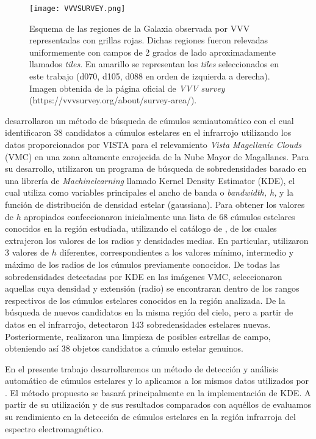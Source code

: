 \documentclass[baaa]{baaa}
\begin{document}
 
 \begin{figure*}[!t]
\centering

\texttt{[image: VVVSURVEY.png]}
\caption{Esquema de las regiones de la Galaxia observada por VVV representadas con grillas rojas. Dichas regiones fueron relevadas uniformemente con campos de 2 grados de lado aproximadamente llamados \textit{tiles}. En amarillo se representan los \textit{tiles} seleccionados en este trabajo (d070, d105, d088 en orden de izquierda a derecha). Imagen obtenida de la página oficial de \textit{VVV survey} (https://vvvsurvey.org/about/survey-area/).}
\label{Figura}

\end{figure*}
 \par
\cite{piatti2016vmc} desarrollaron un método de búsqueda de cúmulos semiautomático con el cual identificaron 38 candidatos a cúmulos estelares en el infrarrojo utilizando los datos proporcionados por VISTA para el relevamiento \textit{Vista Magellanic Clouds} (VMC) en una zona altamente enrojecida de la Nube Mayor de Magallanes. Para su desarrollo, utilizaron un programa de búsqueda de sobredensidades basado en una librería de \textit{Machinelearning} llamado {\sc Kernel Density Estimator (KDE), el} cual utiliza como variables principales el ancho de banda o \textit{bandwidth, h,} y la función de distribución de densidad estelar (gaussiana). Para obtener los valores de $h$ apropiados confeccionaron inicialmente una lista de 68 cúmulos estelares conocidos en la región estudiada, utilizando el catálogo de \cite{bica2008general}, de los cuales extrajeron los valores de los radios y densidades medias. En particular, utilizaron 3 valores de $h$ diferentes, correspondientes a los valores mínimo, intermedio y máximo de los radios de los cúmulos previamente conocidos. De todas las sobredensidades detectadas por {\sc KDE} en las imágenes VMC, \cite{piatti2016vmc} seleccionaron aquellas cuya densidad y extensión (radio) se encontraran dentro de los rangos respectivos de los cúmulos estelares conocidos en la región analizada. De la búsqueda de nuevos candidatos en la misma región del cielo, pero a partir de datos en el infrarrojo, \cite{piatti2016vmc} detectaron 143 sobredensidades estelares nuevas. Posteriormente, realizaron una limpieza de posibles estrellas de campo, obteniendo así 38 objetos candidatos a cúmulo estelar genuinos.
\par
En el presente trabajo desarrollaremos un método de detección y análisis automático de cúmulos estelares y lo aplicamos a los mismos datos utilizados por
\cite{borissova2011new}. El método propuesto se basará principalmente en la implementación de {\sc KDE}. A partir de su utilización y de sus resultados comparados con aquéllos de \cite{borissova2011new} evaluamos su rendimiento en la detección de cúmulos estelares en la región infrarroja del espectro electromagnético.
\end{document}
